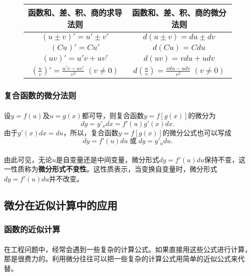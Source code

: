\bgroup
\def\arraystretch{2}
\setlength\tabcolsep{1.2cm}
\begin{figure}[H]
\centering
  \begin{tabular}{c|c}
    \hline
    函数和、差、积、商的求导法则 & 函数和、差、积、商的微分法则 \\
    \hline
    $(u \pm v)' = u' \pm v'$ & $d(u \pm v) = du \pm dv$ \\
    $(Cu)' = Cu'$ & $d(Cu) = Cdu$ \\
    $(uv)' = u'v + uv'$ & $d(uv) = vdu + udv$ \\
    $(\frac{u}{v})' = \frac{u'v - uv'}{v^2} \;(v \neq 0)$ & $d(\frac{u}{v}) = \frac{vdu - udv}{v^2} \;(v \neq 0)$ \\
    \hline
  \end{tabular}
\end{figure}
\egroup

\subsubsection{复合函数的微分法则}
\paragraph{}
设$y = f(u)$及$u = g(x)$都可导，则复合函数$y=f[g(x)]$的微分为
\begin{equation}
  dy = y'_x dx = f'(u)g'(x)dx.
\end{equation}
由于$g'(x)dx = du$，所以，复合函数$y = f[g(x)]$的微分公式也可以写成
\begin{equation}
  dy = f'(u)du \; \text{或} \; dy = y'_u du.
\end{equation}

\paragraph{}
由此可见，无论$u$是自变量还是中间变量，微分形式$dy = f'(u)du$保持不变，这一性质称为\textbf{微分形式不变性}。这性质表示，当变换自变量时，微分形式$dy = f'(u)du$并不改变。

\subsection{微分在近似计算中的应用}
\subsubsection{函数的近似计算}
\paragraph{}
在工程问题中，经常会遇到一些复杂的计算公式。如果直接用这些公式进行计算，那是很费力的。利用微分往往可以把一些复杂的计算公式用简单的近似公式来代替。

